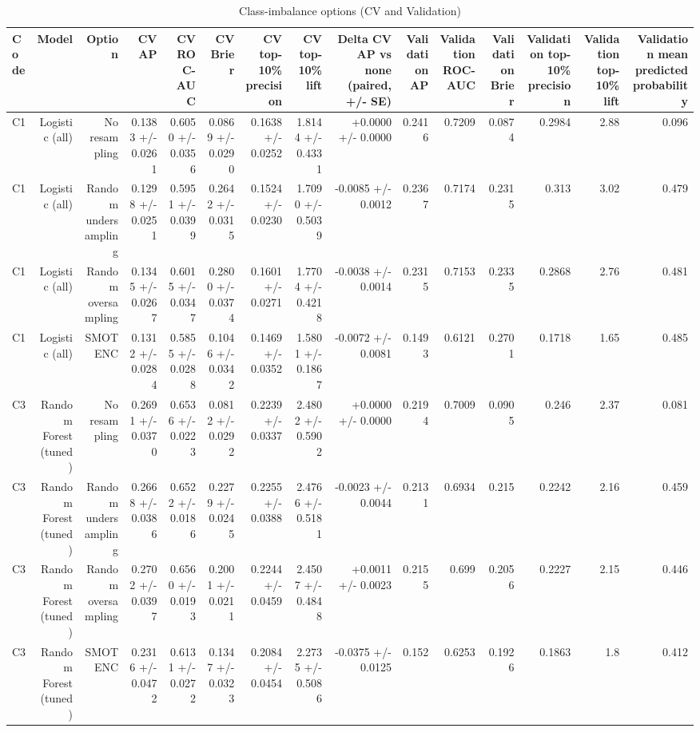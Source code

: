 \begin{table}[htbp]
\centering
\small
\caption{Class-imbalance options (CV and Validation)}
\begin{tabular}{lrrrrrrrrrrrrrr}
\toprule
Code & Model & Option & CV AP & CV ROC-AUC & CV Brier & CV top-10\% precision & CV top-10\% lift & Delta CV AP vs none (paired, +/- SE) & Validation AP & Validation ROC-AUC & Validation Brier & Validation top-10\% precision & Validation top-10\% lift & Validation mean predicted probability \\
\midrule
C1 & Logistic (all) & No resampling & 0.1383 +/- 0.0261 & 0.6050 +/- 0.0356 & 0.0869 +/- 0.0290 & 0.1638 +/- 0.0252 & 1.8144 +/- 0.4331 & +0.0000 +/- 0.0000 & 0.2416 & 0.7209 & 0.0874 & 0.2984 & 2.88 & 0.096 \\
C1 & Logistic (all) & Random undersampling & 0.1298 +/- 0.0251 & 0.5951 +/- 0.0399 & 0.2642 +/- 0.0315 & 0.1524 +/- 0.0230 & 1.7090 +/- 0.5039 & -0.0085 +/- 0.0012 & 0.2367 & 0.7174 & 0.2315 & 0.313 & 3.02 & 0.479 \\
C1 & Logistic (all) & Random oversampling & 0.1345 +/- 0.0267 & 0.6015 +/- 0.0347 & 0.2800 +/- 0.0374 & 0.1601 +/- 0.0271 & 1.7704 +/- 0.4218 & -0.0038 +/- 0.0014 & 0.2315 & 0.7153 & 0.2335 & 0.2868 & 2.76 & 0.481 \\
C1 & Logistic (all) & SMOTENC & 0.1312 +/- 0.0284 & 0.5855 +/- 0.0288 & 0.1046 +/- 0.0342 & 0.1469 +/- 0.0352 & 1.5801 +/- 0.1867 & -0.0072 +/- 0.0081 & 0.1493 & 0.6121 & 0.2701 & 0.1718 & 1.65 & 0.485 \\
C3 & Random Forest (tuned) & No resampling & 0.2691 +/- 0.0370 & 0.6536 +/- 0.0223 & 0.0812 +/- 0.0292 & 0.2239 +/- 0.0337 & 2.4802 +/- 0.5902 & +0.0000 +/- 0.0000 & 0.2194 & 0.7009 & 0.0905 & 0.246 & 2.37 & 0.081 \\
C3 & Random Forest (tuned) & Random undersampling & 0.2668 +/- 0.0386 & 0.6522 +/- 0.0186 & 0.2279 +/- 0.0245 & 0.2255 +/- 0.0388 & 2.4766 +/- 0.5181 & -0.0023 +/- 0.0044 & 0.2131 & 0.6934 & 0.215 & 0.2242 & 2.16 & 0.459 \\
C3 & Random Forest (tuned) & Random oversampling & 0.2702 +/- 0.0397 & 0.6560 +/- 0.0193 & 0.2001 +/- 0.0211 & 0.2244 +/- 0.0459 & 2.4507 +/- 0.4848 & +0.0011 +/- 0.0023 & 0.2155 & 0.699 & 0.2056 & 0.2227 & 2.15 & 0.446 \\
C3 & Random Forest (tuned) & SMOTENC & 0.2316 +/- 0.0472 & 0.6131 +/- 0.0272 & 0.1347 +/- 0.0323 & 0.2084 +/- 0.0454 & 2.2735 +/- 0.5086 & -0.0375 +/- 0.0125 & 0.152 & 0.6253 & 0.1926 & 0.1863 & 1.8 & 0.412 \\
\bottomrule
\end{tabular}
\par\smallskip\begin{minipage}{\linewidth}\footnotesize \end{minipage}
\end{table}

